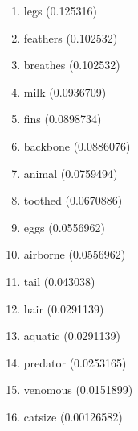 \begin{enumerate}
\item legs (0.125316)
\item feathers (0.102532)
\item breathes (0.102532)
\item milk (0.0936709)
\item fins (0.0898734)
\item backbone (0.0886076)
\item animal (0.0759494)
\item toothed (0.0670886)
\item eggs (0.0556962)
\item airborne (0.0556962)
\item tail (0.043038)
\item hair (0.0291139)
\item aquatic (0.0291139)
\item predator (0.0253165)
\item venomous (0.0151899)
\item catsize (0.00126582)
\end{enumerate}